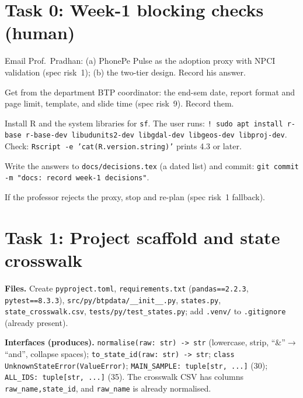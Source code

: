 \documentclass[10pt,a4paper]{article}
\newcommand{\f}[1]{\texttt{#1}}
\begin{document}
\section{Task 0: Week-1 blocking checks (human)}
\begin{steps}
\item Email Prof.\ Pradhan: (a) PhonePe Pulse as the adoption proxy with NPCI validation (spec risk~1);
      (b) the two-tier design. Record his answer.
\item Get from the department BTP coordinator: the end-sem date, report format and page limit, template, and slide
      time (spec risk~9). Record them.
\item Install R and the system libraries for \f{sf}. The user runs:
      \f{! sudo apt install r-base r-base-dev libudunits2-dev libgdal-dev libgeos-dev libproj-dev}.
      Check: \f{Rscript -e 'cat(R.version.string)'} prints 4.3 or later.
\item Write the answers to \f{docs/decisions.tex} (a dated list) and commit:
      \f{git commit -m "docs: record week-1 decisions"}.
\end{steps}
If the professor rejects the proxy, stop and re-plan (spec risk~1 fallback).

\section{Task 1: Project scaffold and state crosswalk}
\textbf{Files.} Create \f{pyproject.toml}, \f{requirements.txt} (\f{pandas==2.2.3}, \f{pytest==8.3.3}),
\f{src/py/btpdata/\_\_init\_\_.py}, \f{states.py}, \f{state\_crosswalk.csv}, \f{tests/py/test\_states.py};
add \f{.venv/} to \f{.gitignore} (already present).

\textbf{Interfaces (produces).}
\f{normalise(raw: str) -> str} (lowercase, strip, ``\&''$\to$``and'', collapse spaces);
\f{to\_state\_id(raw: str) -> str}; \f{class UnknownStateError(ValueError)};
\f{MAIN\_SAMPLE: tuple[str, ...]} (30); \f{ALL\_IDS: tuple[str, ...]} (35).
The crosswalk CSV has columns \f{raw\_name,state\_id}, and \f{raw\_name} is already normalised.
\end{document}
